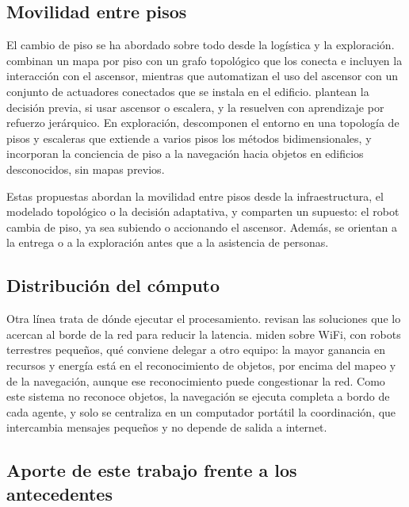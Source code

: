\subsection{Movilidad entre pisos}

El cambio de piso se ha abordado sobre todo desde la logística y la exploración.
\textcite{kim2024indoor} combinan un mapa por piso con un grafo topológico que los conecta e
incluyen la interacción con el ascensor, mientras que \textcite{song2024elevator} automatizan
el uso del ascensor con un conjunto de actuadores conectados que se instala en el edificio.
\textcite{luo2025elevator} plantean la decisión previa, si usar ascensor o escalera, y la
resuelven con aprendizaje por refuerzo jerárquico. En exploración, \textcite{chen2025lite}
descomponen el entorno en una topología de pisos y escaleras que extiende a varios pisos los
métodos bidimensionales, y \textcite{gong2026stairway} incorporan la conciencia de piso a la
navegación hacia objetos en edificios desconocidos, sin mapas previos.

Estas propuestas abordan la movilidad entre pisos desde la infraestructura, el modelado
topológico o la decisión adaptativa, y comparten un supuesto: el robot cambia de piso, ya sea
subiendo o accionando el ascensor. Además, se orientan a la entrega o a la exploración antes
que a la asistencia de personas.

\subsection{Distribución del cómputo}

Otra línea trata de dónde ejecutar el procesamiento. \textcite{tahir2025edge} revisan las
soluciones que lo acercan al borde de la red para reducir la latencia. \textcite{dordevic2023offloading} miden sobre WiFi, con robots terrestres pequeños, qué
conviene delegar a otro equipo: la mayor ganancia en recursos y energía está en el
reconocimiento de objetos, por encima del mapeo y de la navegación, aunque ese reconocimiento
puede congestionar la red. Como este sistema no reconoce objetos, la navegación se ejecuta completa
a bordo de cada agente, y solo se centraliza en un computador portátil la coordinación, que
intercambia mensajes pequeños y no depende de salida a internet.

\subsection{Aporte de este trabajo frente a los antecedentes}
\label{sec:aporte}

